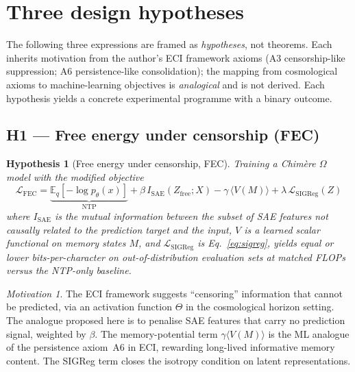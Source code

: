 \documentclass[10pt,a4paper]{article}
\newtheorem{hypothesis}{Hypothesis}
\theoremstyle{remark}
\newtheorem{motivation}{Motivation}
\begin{document}
\section{Three design hypotheses}
\label{sec:equations}

The following three expressions are framed as
\emph{hypotheses}, not theorems. Each inherits motivation from the
author's ECI framework axioms (A3 censorship-like suppression; A6
persistence-like consolidation); the mapping from cosmological
axioms to machine-learning objectives is \emph{analogical} and is
not derived. Each hypothesis yields a concrete experimental
programme with a binary outcome.

\subsection{H1 --- Free energy under censorship (FEC)}

\begin{hypothesis}[Free energy under censorship, FEC]
\label{hyp:fec}
Training a Chim\`ere $\Omega$ model with the modified objective
\begin{equation}
 \mathcal{L}_{\mathrm{FEC}} =
 \underbrace{\mathbb{E}_q[-\log p_\theta(x)]}_{\mathrm{NTP}}
 + \beta\, I_{\mathrm{SAE}}(Z_{\mathrm{free}}; X)
 - \gamma\, \langle V(M) \rangle
 + \lambda\, \mathcal{L}_{\mathrm{SIGReg}}(Z)
 \label{eq:FEC}
\end{equation}
where $I_{\mathrm{SAE}}$ is the mutual information between the
subset of SAE features not causally related to the prediction target
and the input, $V$ is a learned scalar functional on memory states
$M$, and $\mathcal{L}_{\mathrm{SIGReg}}$ is
Eq.~\eqref{eq:sigreg}, yields equal or lower bits-per-character on
out-of-distribution evaluation sets at matched FLOPs versus the
NTP-only baseline.
\end{hypothesis}

\begin{motivation}
The ECI framework suggests ``censoring'' information that cannot be
predicted, via an activation function $\Theta$ in the cosmological
horizon setting. The analogue proposed here is to penalise SAE
features that carry no prediction signal, weighted by
$\beta$. The memory-potential term $\gamma \langle V(M) \rangle$ is
the ML analogue of the persistence axiom~A6 in ECI, rewarding
long-lived informative memory content. The SIGReg term closes the
isotropy condition on latent representations.
\end{motivation}
\end{document}
